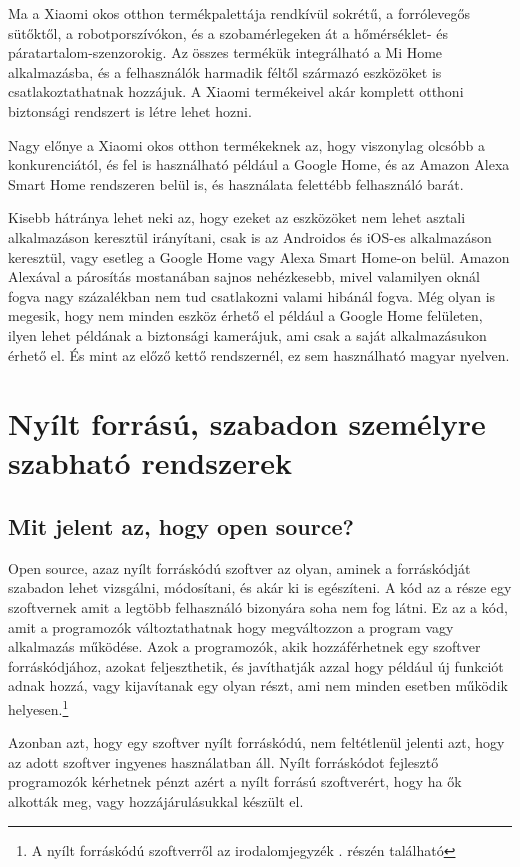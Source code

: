 \documentclass[
]{thesis-ekf}
\theoremstyle{definition}
\theoremstyle{remark}
\begin{document}
	Ma a Xiaomi okos otthon termékpalettája rendkívül sokrétű, a forrólevegős sütőktől, a robotporszívókon, és a szobamérlegeken át a hőmérséklet- és páratartalom-szenzorokig. Az összes termékük integrálható a Mi Home alkalmazásba, és a felhasználók harmadik féltől származó eszközöket is csatlakoztathatnak hozzájuk. A Xiaomi termékeivel akár komplett otthoni biztonsági rendszert is létre lehet hozni.
	
	Nagy előnye a Xiaomi okos otthon termékeknek az, hogy viszonylag olcsóbb a konkurenciától, és fel is használható például a Google Home, és az Amazon Alexa Smart Home rendszeren belül is, és használata felettébb felhasználó barát.
	
	Kisebb hátránya lehet neki az, hogy ezeket az eszközöket nem lehet asztali alkalmazáson keresztül irányítani, csak is az Androidos és iOS-es alkalmazáson keresztül, vagy esetleg a Google Home vagy Alexa Smart Home-on belül. Amazon Alexával a párosítás mostanában sajnos nehézkesebb, mivel valamilyen oknál fogva nagy százalékban nem tud csatlakozni valami hibánál fogva. Még olyan is megesik, hogy nem minden eszköz érhető el például a Google Home felületen, ilyen lehet példának a biztonsági kamerájuk, ami csak a saját alkalmazásukon érhető el. És mint az előző kettő rendszernél, ez sem használható magyar nyelven.
	
	\section{Nyílt forrású, szabadon személyre szabható rendszerek}
	\subsection*{Mit jelent az, hogy open source?}
	
	Open source, azaz nyílt forráskódú szoftver az olyan, aminek a forráskódját szabadon lehet vizsgálni, módosítani, és akár ki is egészíteni. A kód az a része egy szoftvernek amit a legtöbb felhasználó bizonyára soha nem fog látni. Ez az a kód, amit a programozók változtathatnak hogy megváltozzon a program vagy alkalmazás működése. Azok a programozók, akik hozzáférhetnek egy szoftver forráskódjához, azokat feljeszthetik, és javíthatják azzal hogy például új funkciót adnak hozzá, vagy kijavítanak egy olyan részt, ami nem minden esetben működik helyesen.\footnote{\label{open-source-fn}A nyílt forráskódú szoftverről az irodalomjegyzék \cite{what-is-open-source}. részén található}
	
	Azonban azt, hogy egy szoftver nyílt forráskódú, nem feltétlenül jelenti azt, hogy az adott szoftver ingyenes használatban áll. Nyílt forráskódot fejlesztő programozók kérhetnek pénzt azért a nyílt forrású szoftverért, hogy ha ők alkották meg, vagy hozzájárulásukkal készült el. 
	
\end{document}
